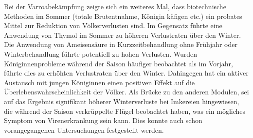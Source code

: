 Bei der Varroabekämpfung zeigte sich ein weiteres Mal, dass biotechnische Methoden im Sommer (totale Brutentnahme, Königin käfigen etc.) ein probates Mittel zur Reduktion von Völkerverlusten sind. Im Gegensatz führte eine Anwendung von Thymol im Sommer zu höheren Verlustraten über den Winter. Die Anwendung von Ameisensäure in Kurzzeitbehandlung ohne Frühjahr oder Winterbehandlung führte potentiell zu hohen Verlusten.
\newline
Wurden Königinnenprobleme während der Saison häufiger beobachtet als im Vorjahr, führte dies zu erhöhten Verlustraten über den Winter. Dahingegen hat ein aktiver Austausch mit jungen Königinnen einen positiven Effekt auf die Überlebenswahrscheinlichkeit der Völker.
\newline
Als Brücke zu den anderen Modulen, sei auf das Ergebnis signifikant höherer Winterverluste bei Imkereien hingewiesen, die während der Saison verkrüppelte Flügel beobachtet haben, was ein mögliches Symptom von Virenerkrankung sein kann. Dies konnte auch schon vorangegangenen Untersuchungen festgestellt werden.